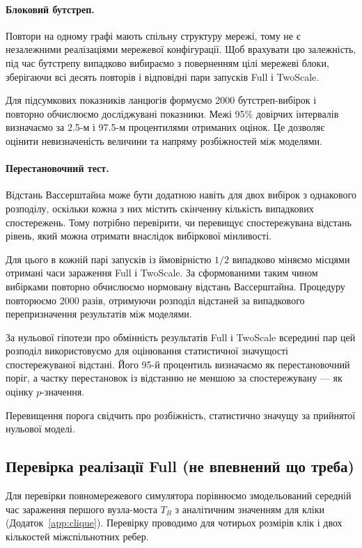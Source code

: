\documentclass[a4paper,fleqn]{cas-sc}
\begin{document}
\paragraph{Блоковий бутстреп.}
Повтори на одному графі мають спільну структуру
мережі, тому не є незалежними реалізаціями
мережевої конфігурації. Щоб врахувати цю
залежність, під час бутстрепу випадково
вибираємо з поверненням цілі мережеві блоки,
зберігаючи всі десять повторів і відповідні
пари запусків Full і TwoScale.

Для підсумкових показників ланцюгів формуємо
2000 бутстреп-вибірок і повторно обчислюємо
досліджувані показники. Межі 95\% довірчих
інтервалів визначаємо за 2.5-м і 97.5-м
процентилями отриманих оцінок.
Це дозволяє оцінити невизначеність величини
та напряму розбіжностей між моделями.

\paragraph{Перестановочний тест.}
Відстань Вассерштайна може бути додатною
навіть для двох вибірок з однакового розподілу,
оскільки кожна з них містить скінченну
кількість випадкових спостережень.
Тому потрібно перевірити, чи перевищує
спостережувана відстань рівень, який
можна отримати внаслідок вибіркової
мінливості.

Для цього в кожній парі запусків
із ймовірністю $1/2$ випадково міняємо
місцями отримані часи зараження
Full і TwoScale. За сформованими таким
чином вибірками повторно обчислюємо
нормовану відстань Вассерштайна.
Процедуру повторюємо 2000 разів,
отримуючи розподіл відстаней за випадкового
перепризначення результатів між моделями.

За нульової гіпотези про обмінність
результатів Full і TwoScale всередині пар
цей розподіл використовуємо для оцінювання
статистичної значущості спостережуваної
відстані. Його 95-й процентиль визначаємо
як перестановочний поріг, а частку
перестановок із відстанню не меншою
за спостережувану --- як оцінку
$p$-значення.

Перевищення порога свідчить про розбіжність,
статистично значущу за прийнятої нульової
моделі. 






\subsection{Перевірка реалізації Full (не впевнений що треба)}

Для перевірки повномережевого симулятора
порівнюємо змодельований середній час
зараження першого вузла-моста $T_B$
з аналітичним значенням для кліки
(Додаток~\ref*{app:clique}).
Перевірку проводимо для чотирьох
розмірів клік і двох кількостей
міжспільнотних ребер.
\end{document}
